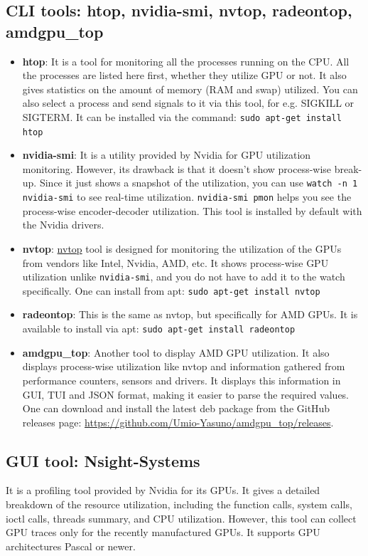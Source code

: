 \documentclass[a4paper,12pt, final]{report}
\begin{document}
\subsection{CLI tools: htop, nvidia-smi, nvtop, radeontop, amdgpu\_top}
\begin{itemize}
    \item \textbf{htop}: It is a tool for monitoring all the processes running on the CPU. All the processes are listed here first, whether they utilize GPU or not. It also gives statistics on the amount of memory (RAM and swap) utilized. You can also select a process and send signals to it via this tool, for e.g. SIGKILL or SIGTERM. It can be installed via the command: \verb|sudo apt-get install htop|
    \item \textbf{nvidia-smi}: It is a utility provided by Nvidia for GPU utilization monitoring. However, its drawback is that it doesn't show process-wise break-up. Since it just shows a snapshot of the utilization, you can use \texttt{watch -n 1 nvidia-smi} to see real-time utilization. \texttt{nvidia-smi pmon} helps you see the process-wise encoder-decoder utilization. This tool is installed by default with the Nvidia drivers. %
    \item \textbf{nvtop}: \href{https://github.com/Syllo/nvtop}{nvtop} tool is designed for monitoring the utilization of the GPUs from vendors like Intel, Nvidia, AMD, etc. It shows process-wise GPU utilization unlike \texttt{nvidia-smi}, and you do not have to add it to the watch specifically. One can install from apt: \verb|sudo apt-get install nvtop|
    \item \textbf{radeontop}: This is the same as nvtop, but specifically for AMD GPUs. It is available to install via apt: \verb|sudo apt-get install radeontop|
    \item \textbf{amdgpu\_top}: Another tool to display AMD GPU utilization. It also displays process-wise utilization like nvtop and information gathered from performance counters, sensors and drivers. It displays this information in GUI, TUI and JSON format, making it easier to parse the required values. One can download and install the latest deb package from the GitHub releases page: \url{https://github.com/Umio-Yasuno/amdgpu_top/releases}.
\end{itemize}

\subsection{GUI tool: Nsight-Systems}
It is a profiling tool provided by Nvidia for its GPUs. It gives a detailed breakdown of the resource utilization, including the function calls, system calls, ioctl calls, threads summary, and CPU utilization. However, this tool can collect GPU traces only for the recently manufactured GPUs. It supports GPU architectures Pascal or newer. \cite{nsight_sys_gpu_support} \\
\end{document}
